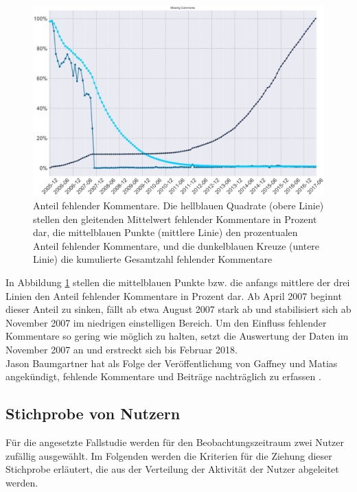\documentclass[11pt,a4paper,twoside]{article}
\begin{document}
\begin{figure}

{\centering \includegraphics[width=0.8\linewidth]{./images/gaffneymatias_fig4} 

}

\caption{Anteil fehlender Kommentare. Die hellblauen Quadrate (obere
Linie) stellen den gleitenden Mittelwert fehlender Kommentare in Prozent
dar, die mittelblauen Punkte (mittlere Linie) den prozentualen Anteil
fehlender Kommentare, und die dunkelblauen Kreuze (untere Linie) die
kumulierte Gesamtzahl fehlender Kommentare \autocite[Abbildung
aus][]{Gaffney2018}}\label{fig:gf4}
\end{figure}

In Abbildung \ref{fig:gf4} stellen die mittelblauen Punkte bzw. die
anfangs mittlere der drei Linien den Anteil fehlender Kommentare in
Prozent dar. Ab April 2007 beginnt dieser Anteil zu sinken, fällt ab
etwa August 2007 stark ab und stabilisiert sich ab November 2007 im
niedrigen einstelligen Bereich. Um den Einfluss fehlender Kommentare so
gering wie möglich zu halten, setzt die Auswertung der Daten im November
2007 an und erstreckt sich bis Februar 2018.\\
Jason Baumgartner hat als Folge der Veröffentlichung von Gaffney und
Matias angekündigt, fehlende Kommentare und Beiträge nachträglich zu
erfassen \autocite{Baumgartner2018}.

\hypertarget{stichprobe}{%
\subsection{Stichprobe von Nutzern}\label{stichprobe}}

Für die angesetzte Fallstudie werden für den Beobachtungszeitraum zwei
Nutzer zufällig ausgewählt. Im Folgenden werden die Kriterien für die
Ziehung dieser Stichprobe erläutert, die aus der Verteilung der
Aktivität der Nutzer abgeleitet werden.
\end{document}
